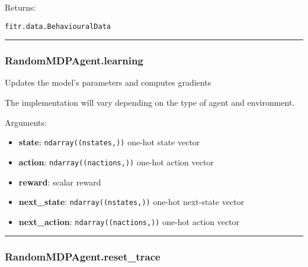 Returns:

\texttt{fitr.data.BehaviouralData}

\begin{center}\rule{0.5\linewidth}{\linethickness}\end{center}

\subsubsection{RandomMDPAgent.learning}\label{randommdpagent.learning}

\begin{Shaded}
\begin{Highlighting}[]
\end{Highlighting}
\end{Shaded}

Updates the model's parameters and computes gradients

The implementation will vary depending on the type of agent and
environment.

Arguments:

\begin{itemize}
\tightlist
\item
  \textbf{state}: \texttt{ndarray((nstates,))} one-hot state vector
\item
  \textbf{action}: \texttt{ndarray((nactions,))} one-hot action vector
\item
  \textbf{reward}: scalar reward
\item
  \textbf{next\_state}: \texttt{ndarray((nstates,))} one-hot next-state
  vector
\item
  \textbf{next\_action}: \texttt{ndarray((nactions,))} one-hot action
  vector
\end{itemize}

\begin{center}\rule{0.5\linewidth}{\linethickness}\end{center}

\subsubsection{RandomMDPAgent.reset\_trace}\label{randommdpagent.reset_trace}

\begin{Shaded}
\begin{Highlighting}[]
\OperatorTok{=}\NormalTok{)}
\end{Highlighting}
\end{Shaded}

